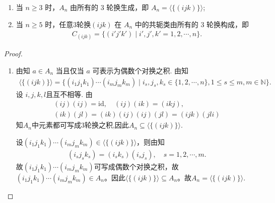 \documentclass[../../main.tex]{subfiles}%
\begin{document}
\begin{theorem}\label{theorem:抽象代数--定理4.4.2}
\begin{enumerate}[(1)]
\item\label{theorem:抽象代数--定理4.4.2-1} 当 \( n \geqslant 3 \) 时，\( A_n \) 由所有的 3 轮换生成，即 \( A_n = \langle \{(ijk)\} \rangle \);

\item\label{theorem:抽象代数--定理4.4.2-2} 当 \( n \geqslant 5 \) 时，任意3轮换\( (ijk) \) 在 \( A_n \) 中的共轭类由所有的 3 轮换构成，即
\begin{align*}
C_{(ijk)} = \{(i'j'k')\mid i',j',k'=1,2,\cdots,n\}.
\end{align*}
\end{enumerate}
\end{theorem}
\begin{proof}
\begin{enumerate}[(1)]
\item 由知 \( a \in A_n \) 当且仅当 \( a \) 可表示为偶数个对换之积. 由知
\begin{align*}
\langle \{(ijk)\} \rangle = \{ (i_1j_1k_1)\cdots(i_mj_mk_m) \mid i_s,j_s,k_s \in \{1,2,\cdots,n\}, 1 \leqslant s \leqslant m, m \in \mathbb{N} \}.
\end{align*}
设 \( i, j, k, l \)且互不相等. 由
\begin{gather*}
(ij)(ij) = \mathrm{id}, \quad (ij)(ik) = (ikj), \\
(ik)(jl) = (ik)(ij)(ij)(jl) = (ijk)(jli)
\end{gather*}
知$A_n$中元素都可写成3轮换之积,因此$A_n\subseteq \langle \{(ijk)\} \rangle$.

设$(i_1j_1k_1)\cdots(i_mj_mk_m) \in \langle \{(ijk)\} \rangle$，则由知
\begin{align*}
(i_sj_sk_s) = (i_sk_s)(i_sj_s), \quad s=1,2,\cdots,m.
\end{align*}
故$(i_1j_1k_1)\cdots(i_mj_mk_m)$可写成偶数个对换之积，故$(i_1j_1k_1)\cdots(i_mj_mk_m) \in A_n$。因此$\langle \{(ijk)\} \rangle \subseteq A_n$。故\( A_n = \langle \{(ijk)\} \rangle \).


\end{enumerate}
\end{proof}
\end{document}

